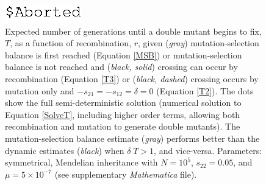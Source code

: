 \documentclass[review,3p,authoryear]{elsarticle}
\begin{document}
\renewcommand{\thefigure}{A\arabic{figure}}
\setcounter{figure}{0} 
\begin{figure}[t]
\centering
\includegraphics[width=0.9\linewidth]{IMAGES/DetApproxsDeltaBW.eps}
\caption{
Expected number of generations until a double mutant begins to fix, $T$, as a function of recombination, $r$, given (\textit{gray}) mutation-selection balance is first reached (Equation \ref{MSB}) or mutation-selection balance is not reached and (\textit{black, solid}) crossing can occur by recombination (Equation \ref{T3}) or (\textit{black, dashed}) crossing occurs by mutation only and $-s_{21}=-s_{12}=\delta=0$ (Equation \ref{T2}).
The dots show the full semi-deterministic solution (numerical solution to Equation \ref{SolveT}, including higher order terms, allowing both recombination and mutation to generate double mutants).
The mutation-selection balance estimate (\textit{gray}) performs better than the dynamic estimates (\textit{black}) when $\delta\; T > 1$, and vice-versa.
Parameters: symmetrical, Mendelian inheritance with $N=10^5$, $s_{22}=0.05$, and $\mu=5\times 10^{-7}$ (see supplementary \textit{Mathematica} file).
}
\label{DetApproxsDelta}
\end{figure}
\end{document}
